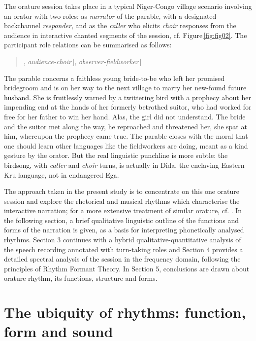 \documentclass[output=paper,colorlinks,citecolor=brown
]{langscibook}
\begin{document}
The orature session takes place in a typical Niger-Congo village scenario involving an orator with two roles: as \textit{narrator} of the parable, with a designated backchannel \textit{responder}, and as the \textit{caller} who elicits \textit{choir} responses from the audience in interactive chanted segments of the session, cf. Figure\,\ref{fig:fig02}. The participant role relations can be summarised as follows:
\begin{quotation}
\centering
[\,[\,[\textit{narrator-caller}, \textit{responder}\,], \textit{audience-choir}\,], \textit{observer-fieldworker}\,]
\end{quotation}
The parable concerns a faithless young bride-to-be who left her promised bridegroom and is on her way to the next village to marry her new-found future husband. She is fruitlessly warned by a twittering bird with a prophecy about her impending end at the hands of her formerly betrothed suitor, who had worked for free for her father to win her hand. Alas, the girl did not understand. The bride and the suitor met along the way, he reproached and threatened her, she spat at him, whereupon the prophecy came true. The parable closes with the moral that one should learn other languages like the fieldworkers are doing, meant as a kind gesture by the orator. But the real linguistic punchline is more subtle: the birdsong, with \textit{caller} and \textit{choir} turns, is actually in Dida, the enclaving Eastern Kru language, not in endangered Ega.

The approach taken in the present study is to concentrate on this one orature session and explore the rhetorical and musical rhythms which characterise the interactive narration; for a more extensive treatment of similar orature, cf. \cite{gibbon4urua2022}. In the following section, a brief qualitative linguistic outline of the functions and forms of the narration is given, as a basis for interpreting phonetically analysed rhythms. Section 3 continues with a hybrid qualitative-quantitative analysis of the speech recording annotated with turn-taking roles and Section 4 provides a detailed spectral analysis of the session in the frequency domain, following the principles of Rhythm Formant Theory. In Section 5, conclusions are drawn about orature rhythm, its functions, structure and forms.


\section{The ubiquity of rhythms: function, form and sound}
\end{document}

